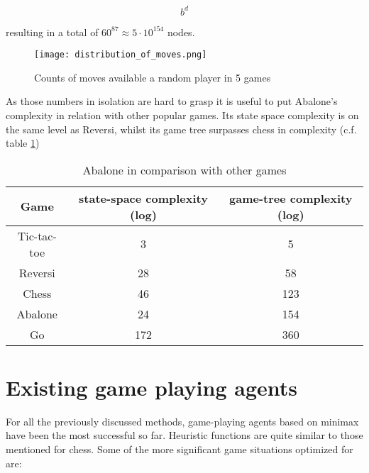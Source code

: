 \begin{equation}
    b^d
\end{equation}

resulting in a total of $60^{87} \approx 5 \cdot 10^{154}$ nodes. \cite{lemmens_constructing_2005}

\begin{figure}
    \centering
    \texttt{[image: distribution\_of\_moves.png]}
    \caption{Counts of moves available a random player in 5 games}
    \label{branching_factor}
\end{figure}

As those numbers in isolation are hard to grasp it is useful to put Abalone's complexity in relation with other popular games. Its state space complexity is on the same level as Reversi, whilst its game tree surpasses chess in complexity (c.f. table \ref{complexity_table})

\begin{table}
    \begin{center}
        \begin{tabular}{  c | c | c  }
            Game        & state-space complexity (log) & game-tree complexity (log) \\
            \hline
            \hline
            Tic-tac-toe & 3                            & 5                          \\
            Reversi     & 28                           & 58                         \\
            Chess       & 46                           & 123                        \\
            Abalone     & 24                           & 154                        \\
            Go          & 172                          & 360                        \\
        \end{tabular}
    \end{center}
    \caption{Abalone in comparison with other games \cite{chorus_implementing_2009}}
    \label{complexity_table}
\end{table}

\section{Existing game playing agents}
\label{existing_game_playing_agents}
For all the previously discussed methods, game-playing agents based on minimax have been the most successful so far. Heuristic functions are quite similar to those mentioned for chess. Some of the more significant game situations optimized for are:

